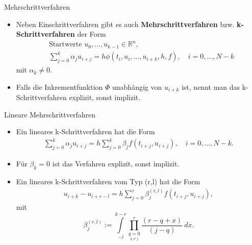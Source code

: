 \begin{frame}{Mehrschrittverfahren}
    \begin{itemize}
        \item<1-> Neben Einschrittverfahren gibt es auch \textbf{Mehrschrittverfahren} bzw. \textbf{k-Schrittverfahren}
        der Form
        \begin{align*}
            &\text{Startwerte } u_0, \dots, u_{k-1} \in \mathbb{R}^n, \nonumber \\
            & \sum_{j=0}^{k} \alpha_j u_{i+j} = h \phi(t_i, u_i, \dots, u_{i+k},h,f), \quad i=0,\dots,N-k
        \end{align*}
        mit $\alpha_k\neq0$.
        \item<2-> Falls die Inkrementfunktion $\Phi$ unabhängig von $u_{i+k}$ ist, nennt man das k-Schrittverfahren
        explizit, sonst implizit.
    \end{itemize}
\end{frame}

\begin{frame}{Lineare Mehrschrittverfahren}
    \begin{itemize}
        \item<1-> Ein lineares k-Schrittverfahren hat die Form
        \begin{align}
            \label{k-schritt-linear}
            \sum_{j=0}^{k} \alpha_j u_{i+j} = h \sum_{j=0}^{k} \beta_j f(t_{i+j}, u_{i+j}), \quad i = 0, \dots, N-k.
        \end{align}
        \item<2-> Für $\beta_k=0$ ist das Verfahren explizit, sonst implizit.
        \item<3-> Ein lineares k-Schrittverfahren vom Typ (r,l) hat die Form
        \begin{align*}
            u_{i+k}-u_{i+r-l} = h \sum_{j=0}^{r} \beta_j^{(r,l)} f(t_{i+j},u_{i+j}),
        \end{align*}
        mit
        \[
            \beta_j^{(r,l)} := \int\limits_{-l}^{k-r} \prod\limits_{\underset{q \neq j}{q=0}}^{r} \frac{(r-q+x)}{(j-q)}\ dx.
        \]
    \end{itemize}
\end{frame}

